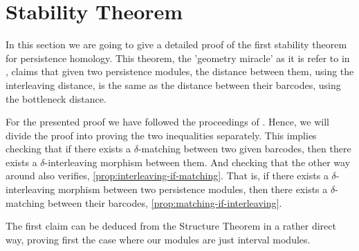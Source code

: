 \newpage
\section{Stability Theorem}
In this section we are going to give a detailed proof of the first stability theorem for persistence homology. This theorem, the 'geometry miracle' as it is refer to in \cite{nanda}, claims that given two persistence modules, the distance between them, using the interleaving distance, is the same as the distance between their barcodes, using the bottleneck distance. 

For the presented proof we have followed the proceedings of \cite{polterovich}. Hence, we will divide the proof into proving the two inequalities separately. This implies checking that if there exists a $\delta$-matching between two given barcodes, then there exists a $\delta$-interleaving morphism between them. And checking that the other way around also verifies, \ref{prop:interleaving-if-matching}. That is, if there exists a $\delta$-interleaving morphism between two persistence modules, then there exists a $\delta$-matching between their barcodes, \ref{prop:matching-if-interleaving}.

The first claim can be deduced from the Structure Theorem in a rather direct way, proving first the case where our modules are just interval modules.

